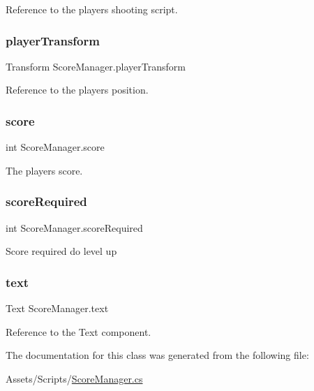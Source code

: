 Reference to the player\textquotesingle{}s shooting script. \mbox{\label{class_score_manager_afa29eba71bb311c9f305a0ab185a1981}} 
\subsubsection{\texorpdfstring{playerTransform}{playerTransform}}
{\footnotesize\ttfamily Transform Score\+Manager.\+player\+Transform\hspace{0.3cm}{\ttfamily [private]}}

Reference to the player\textquotesingle{}s position. \mbox{\label{class_score_manager_ab0036417bd3468315aec1def60f46221}} 
\subsubsection{\texorpdfstring{score}{score}}
{\footnotesize\ttfamily int Score\+Manager.\+score\hspace{0.3cm}{\ttfamily [static]}}

The player\textquotesingle{}s score. \mbox{\label{class_score_manager_a9bb2bec9e7587f8059bec5404749eda1}} 
\subsubsection{\texorpdfstring{scoreRequired}{scoreRequired}}
{\footnotesize\ttfamily int Score\+Manager.\+score\+Required}

Score required do level up \mbox{\label{class_score_manager_a7ef05edbcfef0503c0e0cc501e71e95e}} 
\subsubsection{\texorpdfstring{text}{text}}
{\footnotesize\ttfamily Text Score\+Manager.\+text\hspace{0.3cm}{\ttfamily [private]}}

Reference to the Text component. 

The documentation for this class was generated from the following file\+:\begin{DoxyCompactItemize}
\item 
Assets/\+Scripts/\mbox{\hyperlink{_score_manager_8cs}{Score\+Manager.\+cs}}\end{DoxyCompactItemize}
